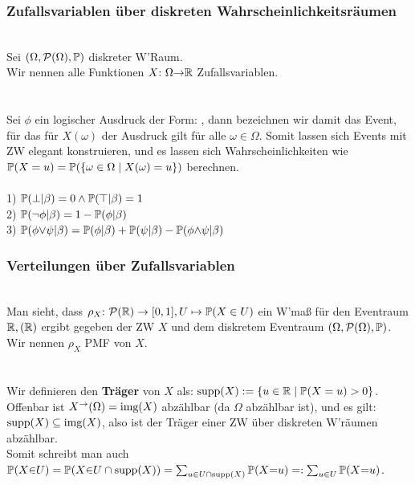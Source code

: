 \subsubsection*{Zufallsvariablen über diskreten Wahrscheinlichkeitsräumen}
 \\
Sei \((\Omega, \mathcal P(\Omega), \mathbb P)\) diskreter W'Raum. \\
Wir nennen alle Funktionen \(X{:}\text{ } \Omega {\rightarrow} \mathbb R\) Zufallsvariablen. \\ \\
 \\
Sei \(\phi\) ein logischer Ausdruck der Form: , dann bezeichnen wir damit das Event, für das für \(X(\omega)\) der Ausdruck gilt für alle \(\omega \in \Omega\). Somit lassen sich Events mit ZW elegant konstruieren, und es lassen sich Wahrscheinlichkeiten wie \(\mathbb P(X = u) = \mathbb P(\{{\omega \in \Omega} \mid {X(\omega) = u}\})\) berechnen. \pagebreak \\
 \\
1) \(\mathbb P(\bot|\beta) = 0 \wedge \mathbb P(\top|\beta) = 1\) \\
2) \(\mathbb P(\neg\phi|\beta) = 1 - \mathbb P(\phi|\beta)\) \\
3) \(\mathbb P(\phi {\vee} \psi | \beta) = \mathbb P(\phi| \beta) + \mathbb P(\psi| \beta) - \mathbb P(\phi {\wedge} \psi| \beta)\)
\subsubsection*{Verteilungen über Zufallsvariablen}
 \\
Man sieht, dass \(\rho_X {:}\text{ } \mathcal P(\mathbb R) \rightarrow [0,1], U \mapsto \mathbb P(X \in U)\) ein W'maß für den Eventraum \(\mathbb R, \mathcal(\mathbb R)\) ergibt gegeben der ZW \(X\) und dem diskretem Eventraum \((\Omega, \mathcal P(\Omega), \mathbb P)\). Wir nennen \(\rho_X\) PMF von \(X\). \\ \\
 \\
Wir definieren den \textbf{Träger} von \(X\) als: \(\text{supp}(X) := \{{u \in \mathbb R} \mid {\mathbb P(X=u) > 0}\}\). \\
Offenbar ist \(X^\rightarrow(\Omega) = \text{img}(X)\) abzählbar (da \(\Omega\) abzählbar ist), und es gilt: \(\text{supp}(X) \subseteq \text{img}(X)\), also ist der Träger einer ZW über diskreten W'räumen abzählbar. \\
Somit schreibt man auch \(\mathbb P(X {\in} U) = \mathbb P(X {\in} {U \cap \text{supp}(X)}) = \sum_{u \in U \cap \text{supp}(X)}\mathbb P(X {=} u) =: \sum_{u \in U}\mathbb P(X {=} u)\).
